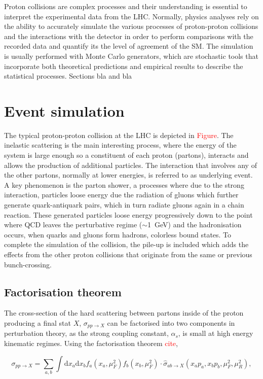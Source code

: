 Proton collisions are complex processes and their understanding is essential to interpret the experimental data from the LHC. Normally, physics analyses rely on the ability to accurately simulate the various processes of proton-proton collisions and the interactions with the detector in order to perform comparisons with the recorded data and quantify its the level of agreement of the SM. The simulation is usually performed with Monte Carlo generators, which are stochastic tools that incorporate both theoretical predictions and empirical results to describe the statistical processes.
Sections bla and bla 

\section{Event simulation}

The typical proton-proton collision at the LHC is depicted in \textcolor{red}{Figure}. The inelastic scattering is the main interesting process, where the energy of the system is large enough so a constituent of each proton (partons), interacts and allows the production of additional particles. The interaction that involves any of the other partons, normally at lower energies, is referred to as underlying event. A key phenomenon is the parton shower, a processes where due to the strong interaction, particles loose energy due the radiation of gluons which further generate quark-antiquark pairs, which in turn radiate gluons again in a chain reaction. These generated particles loose energy progressively down to the point where QCD leaves the perturbative regime ($\sim$1~GeV) and the hadronisation occurs, when quarks and gluons form hadrons, colorless bound states. To complete the simulation of the collision, the pile-up is included which adds the effects from the other proton collisions that originate from the same or previous bunch-crossing.  

\subsection{Factorisation theorem}

The cross-section of the hard scattering between partons inside of the proton producing a final stat $X$, $\sigma_{pp\to X}$ can be factorised into two components in perturbation theory, as the strong coupling constant, $\alpha_s$, is small at high energy kinematic regimes. Using the factorisation theorem \textcolor{red}{cite},

\begin{equation}
    \sigma_{pp\to X}=\sum_{a,b}\int \text{d}x_a\text{d}x_b f_a(x_a,\mu_F^2)f_b(x_b,\mu_F^2)\cdot\hat{\sigma}_{ab\to X}(x_a p_a,x_b p_b,\mu_F^2,\mu_R^2),
\end{equation}


